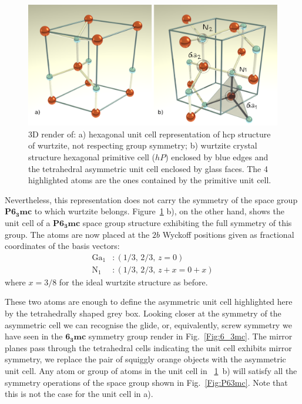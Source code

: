 \begin{figure}
    \centering
\includegraphics[width=1.0\linewidth]{Figures/wurtzite_compare.png}
\caption[Wurzite unit cell crystallographic representation versus hcp structure.]{3D render of: a) hexagonal unit cell representation of hcp structure of wurtzite, not respecting group symmetry; b)  wurtzite crystal structure  hexagonal primitive cell ($hP$) enclosed by blue edges and the tetrahedral asymmetric unit cell enclosed by glass faces. The 4 highlighted atoms are the ones contained by the primitive unit cell.}
\label{Fig:wurtzite}
\end{figure}


Nevertheless, this representation does not carry the symmetry of the space group $\mathbf{P6_3mc}$ to which wurtzite belongs. Figure~\ref{Fig:wurtzite} b), on the other hand, shows the unit cell of a $\mathbf{P6_3mc}$ space group structure exhibiting the full symmetry of this group.  The atoms are now placed at the $2b$ Wyckoff positions given as fractional coordinates of the basis vectors:
\begin{align}
\label{eq:positionGa1}
    \text{Ga}_1 & :(1/3,\, 2/3, \, z=0)\\
\label{eq:positionN1}
    \text{N}_1  & :(1/3,\, 2/3, \, z+x=0+x)
\end{align}
where $x=3/8$ for the ideal wurtzite structure as before. 

These two atoms are enough to define the asymmetric unit cell highlighted here by the tetrahedrally  shaped grey box. Looking closer at  the symmetry of the asymmetric cell we can recognise the glide, or, equivalently, screw symmetry we have seen in the $\mathbf{6_3mc}$ symmetry group render in Fig.~\ref{Fig:6_3mc}. The mirror planes pass through the tetrahedral cells indicating the unit cell exhibits mirror symmetry, \ie we replace the pair of squiggly orange objects with the asymmetric unit cell. Any atom or group of atoms in the unit cell in ~\ref{Fig:wurtzite}~b) will satisfy all the symmetry operations of the space group shown in Fig.~\ref{Fig:P63mc}. Note that this is not the case for the unit cell in a).

